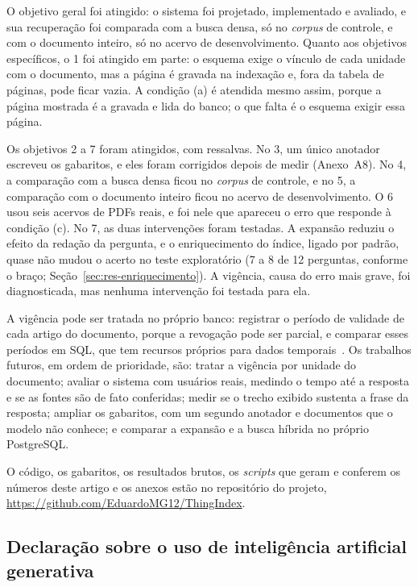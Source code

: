 \documentclass[12pt]{article}
\newcommand{\repositorio}{\url{https://github.com/EduardoMG12/ThingIndex}}
\begin{document}
O objetivo geral foi atingido: o sistema foi projetado, implementado e avaliado, e sua recuperação foi comparada com a busca densa, só no \emph{corpus} de controle, e com o documento inteiro, só no acervo de desenvolvimento. Quanto aos objetivos específicos, o 1 foi atingido em parte: o esquema exige o vínculo de cada unidade com o documento, mas a página é gravada na indexação e, fora da tabela de páginas, pode ficar vazia. A condição (a) é atendida mesmo assim, porque a página mostrada é a gravada e lida do banco; o que falta é o esquema exigir essa página.

Os objetivos 2 a 7 foram atingidos, com ressalvas. No 3, um único anotador escreveu os gabaritos, e eles foram corrigidos depois de medir (Anexo~A8). No 4, a comparação com a busca densa ficou no \emph{corpus} de controle, e no 5, a comparação com o documento inteiro ficou no acervo de desenvolvimento. O 6 usou seis acervos de PDFs reais, e foi nele que apareceu o erro que responde à condição (c). No 7, as duas intervenções foram testadas. A expansão reduziu o efeito da redação da pergunta, e o enriquecimento do índice, ligado por padrão, quase não mudou o acerto no teste exploratório (7 a 8 de 12 perguntas, conforme o braço; Seção~\ref{sec:res-enriquecimento}). A vigência, causa do erro mais grave, foi diagnosticada, mas nenhuma intervenção foi testada para ela.

A vigência pode ser tratada no próprio banco: registrar o período de validade de cada artigo do documento, porque a revogação pode ser parcial, e comparar esses períodos em SQL, que tem recursos próprios para dados temporais~\cite{kulkarni2012temporal}. Os trabalhos futuros, em ordem de prioridade, são: tratar a vigência por unidade do documento; avaliar o sistema com usuários reais, medindo o tempo até a resposta e se as fontes são de fato conferidas; medir se o trecho exibido sustenta a frase da resposta; ampliar os gabaritos, com um segundo anotador e documentos que o modelo não conhece; e comparar a expansão e a busca híbrida no próprio PostgreSQL.

O código, os gabaritos, os resultados brutos, os \emph{scripts} que geram e conferem os números deste artigo e os anexos estão no repositório do projeto, \repositorio.

\subsection*{Declaração sobre o uso de inteligência artificial generativa}
\end{document}

